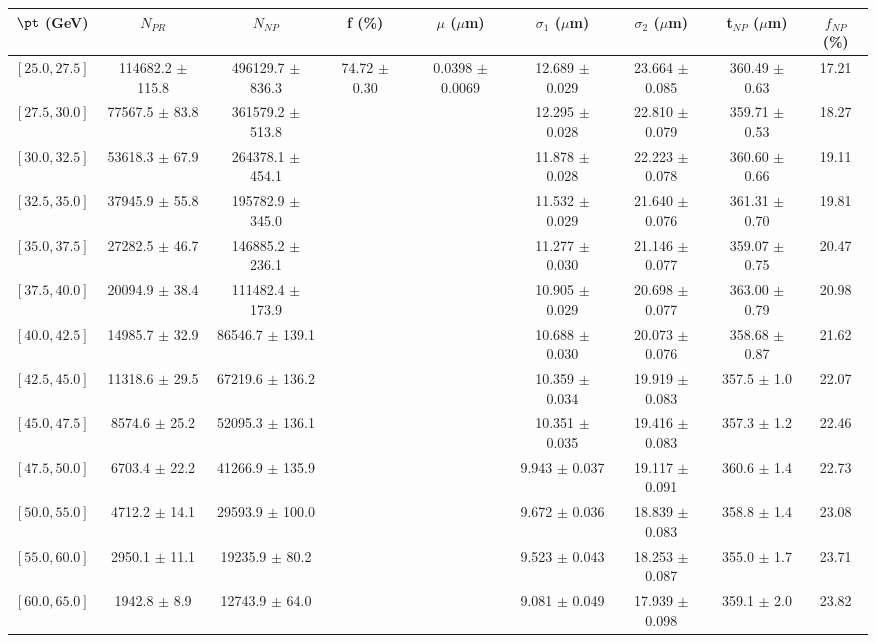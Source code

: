 \begin{tabular}{c||c|c|c|c|c|c|c||c}
$\pt$ (GeV) & $N_{PR}$ & $N_{NP}$ & f (\%) & $\mu$ ($\mu$m) & $\sigma_1$ ($\mu$m) & $\sigma_2$ ($\mu$m)  & t$_{NP}$ ($\mu$m) & $f_{NP}$ (\%) \\
\hline
$[25.0, 27.5]$ & 114682.2 $\pm$ 115.8 & 496129.7 $\pm$ 836.3 & \multirow{19}{*}{74.72 $\pm$ 0.30} & \multirow{19}{*}{0.0398 $\pm$ 0.0069} & 12.689 $\pm$ 0.029 & 23.664 $\pm$ 0.085 & 360.49 $\pm$ 0.63 & 17.21\\
$[27.5, 30.0]$ & 77567.5 $\pm$ 83.8 & 361579.2 $\pm$ 513.8 &  &  & 12.295 $\pm$ 0.028 & 22.810 $\pm$ 0.079 & 359.71 $\pm$ 0.53 & 18.27\\
$[30.0, 32.5]$ & 53618.3 $\pm$ 67.9 & 264378.1 $\pm$ 454.1 &  &  & 11.878 $\pm$ 0.028 & 22.223 $\pm$ 0.078 & 360.60 $\pm$ 0.66 & 19.11\\
$[32.5, 35.0]$ & 37945.9 $\pm$ 55.8 & 195782.9 $\pm$ 345.0 &  &  & 11.532 $\pm$ 0.029 & 21.640 $\pm$ 0.076 & 361.31 $\pm$ 0.70 & 19.81\\
$[35.0, 37.5]$ & 27282.5 $\pm$ 46.7 & 146885.2 $\pm$ 236.1 &  &  & 11.277 $\pm$ 0.030 & 21.146 $\pm$ 0.077 & 359.07 $\pm$ 0.75 & 20.47\\
$[37.5, 40.0]$ & 20094.9 $\pm$ 38.4 & 111482.4 $\pm$ 173.9 &  &  & 10.905 $\pm$ 0.029 & 20.698 $\pm$ 0.077 & 363.00 $\pm$ 0.79 & 20.98\\
$[40.0, 42.5]$ & 14985.7 $\pm$ 32.9 & 86546.7 $\pm$ 139.1 &  &  & 10.688 $\pm$ 0.030 & 20.073 $\pm$ 0.076 & 358.68 $\pm$ 0.87 & 21.62\\
$[42.5, 45.0]$ & 11318.6 $\pm$ 29.5 & 67219.6 $\pm$ 136.2 &  &  & 10.359 $\pm$ 0.034 & 19.919 $\pm$ 0.083 & 357.5 $\pm$ 1.0 & 22.07\\
$[45.0, 47.5]$ & 8574.6 $\pm$ 25.2 & 52095.3 $\pm$ 136.1 &  &  & 10.351 $\pm$ 0.035 & 19.416 $\pm$ 0.083 & 357.3 $\pm$ 1.2 & 22.46\\
$[47.5, 50.0]$ & 6703.4 $\pm$ 22.2 & 41266.9 $\pm$ 135.9 &  &  & 9.943 $\pm$ 0.037 & 19.117 $\pm$ 0.091 & 360.6 $\pm$ 1.4 & 22.73\\
$[50.0, 55.0]$ & 4712.2 $\pm$ 14.1 & 29593.9 $\pm$ 100.0 &  &  & 9.672 $\pm$ 0.036 & 18.839 $\pm$ 0.083 & 358.8 $\pm$ 1.4 & 23.08\\
$[55.0, 60.0]$ & 2950.1 $\pm$ 11.1 & 19235.9 $\pm$ 80.2 &  &  & 9.523 $\pm$ 0.043 & 18.253 $\pm$ 0.087 & 355.0 $\pm$ 1.7 & 23.71\\
$[60.0, 65.0]$ & 1942.8 $\pm$ 8.9 & 12743.9 $\pm$ 64.0 &  &  & 9.081 $\pm$ 0.049 & 17.939 $\pm$ 0.098 & 359.1 $\pm$ 2.0 & 23.82\\

\end{tabular}
